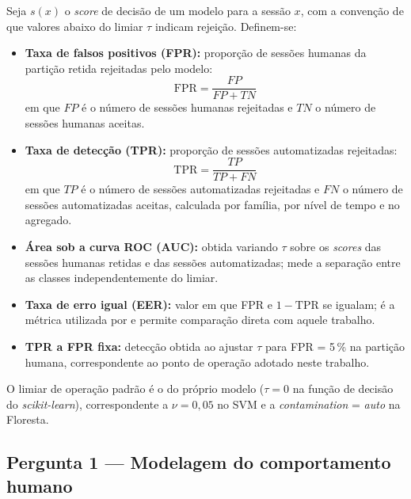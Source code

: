Seja $s(x)$ o \textit{score} de decisão de um modelo para a sessão $x$, com a convenção de que valores abaixo do limiar $\tau$ indicam rejeição. Definem-se:
\begin{itemize}
    \item \textbf{Taxa de falsos positivos (FPR):} proporção de sessões humanas da partição retida rejeitadas pelo modelo:
    \begin{equation}
        \text{FPR} = \frac{FP}{FP + TN}
        \label{eq:fpr}
    \end{equation}
    em que $FP$ é o número de sessões humanas rejeitadas e $TN$ o número de sessões humanas aceitas.
    \item \textbf{Taxa de detecção (TPR):} proporção de sessões automatizadas rejeitadas:
    \begin{equation}
        \text{TPR} = \frac{TP}{TP + FN}
        \label{eq:tpr}
    \end{equation}
    em que $TP$ é o número de sessões automatizadas rejeitadas e $FN$ o número de sessões automatizadas aceitas, calculada por família, por nível de tempo e no agregado.
    \item \textbf{Área sob a curva ROC (AUC):} obtida variando $\tau$ sobre os \textit{scores} das sessões humanas retidas e das sessões automatizadas; mede a separação entre as classes independentemente do limiar.
    \item \textbf{Taxa de erro igual (EER):} valor em que FPR e $1 - \text{TPR}$ se igualam; é a métrica utilizada por  e permite comparação direta com aquele trabalho.
    \item \textbf{TPR a FPR fixa:} detecção obtida ao ajustar $\tau$ para FPR = 5\,\% na partição humana, correspondente ao ponto de operação adotado neste trabalho.
\end{itemize}
O limiar de operação padrão é o do próprio modelo ($\tau = 0$ na função de decisão do \textit{scikit-learn}), correspondente a $\nu = 0{,}05$ no SVM e a \textit{contamination} = \textit{auto} na Floresta.

\subsection{Pergunta 1 --- Modelagem do comportamento humano}
\label{subsec:p1}

